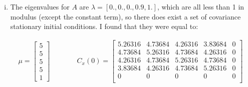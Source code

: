 \documentclass{homework}
\begin{document}
\begin{homeworkProblem}[Problem 2.4]
{\begin{enumerate}[a.]
\begin{enumerate}[i.]
            \begin{align*}
              \mu = \left[\begin{matrix} 10 \\ 10 \\ 10 \\ 10 \\ 1 \end{matrix}\right]
              \quad & \qquad
              C_x(0) = \begin{bmatrix}
                        29.7143 & 27.4286 & 24 & 20.5714 & 0\\
                        27.4286 & 29.7143 & 27.4286 & 24 & 0\\
                        24 & 27.4286 & 29.7143 & 27.4286 & 0\\
                        20.5714 & 24 & 27.4286 & 29.7143 & 0\\
                        0 & 0 & 0 & 0 & 0\\
                      \end{bmatrix}
            \end{align*}

          \item The eigenvalues for $A$ are $\lambda = [0., 0., 0., 0.9, 1.]$, which are all less than 1 in modulus (except the constant term), so there does exist a set of covariance stationary initial conditions. I found that they were equal to:

            \begin{align*}
              \mu = \left[\begin{matrix} 5 \\ 5 \\ 5 \\ 5 \\ 1 \end{matrix}\right]
              \quad & \qquad
              C_x(0) = \begin{bmatrix}
                        5.26316 & 4.73684 & 4.26316 & 3.83684 & 0\\
                        4.73684 & 5.26316 & 4.73684 & 4.26316 & 0\\
                        4.26316 & 4.73684 & 5.26316 & 4.73684 & 0\\
                        3.83684 & 4.26316 & 4.73684 & 5.26316 & 0\\
                        0 & 0 & 0 & 0 & 0\\
                      \end{bmatrix}
            \end{align*}


\end{enumerate}
\end{enumerate}}
\end{homeworkProblem}
\end{document}

